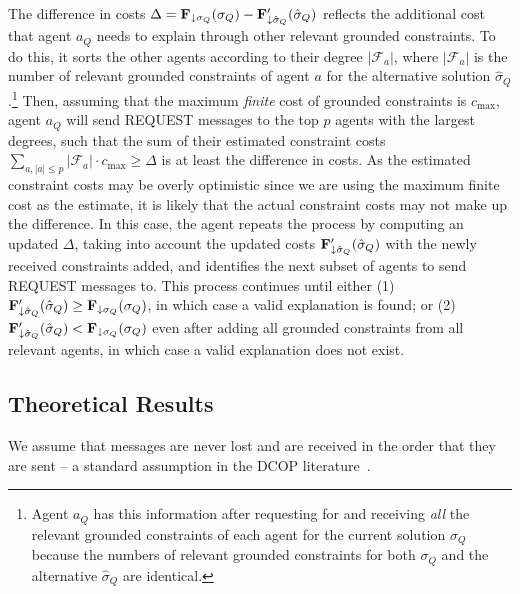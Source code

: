 \documentclass[twoside,11pt]{article}
\begin{document}
The difference in costs $\Delta = {\bf{F}}_{\downarrow \sigma_Q}(\sigma_Q) - {\bf{F}}'_{\downarrow \hat{\sigma}_Q}(\hat{\sigma}_Q)$ reflects the additional cost that agent $a_Q$ needs to explain through other relevant grounded constraints. To do this, it sorts the other agents according to their degree $|\mathcal{F}_a|$, where $|\mathcal{F}_a|$ is the number of relevant grounded constraints of agent $a$ for the alternative solution $\hat{\sigma}_Q$.\footnote{Agent $a_Q$ has this information after requesting for and receiving \emph{all} the relevant grounded constraints of each agent for the current solution $\sigma_Q$ because the numbers of relevant grounded constraints for both $\sigma_Q$ and the alternative $\hat{\sigma}_Q$ are identical.} Then, assuming that the maximum \emph{finite} cost of grounded constraints is $c_{\max}$, agent $a_Q$ will send REQUEST messages to the top $p$ agents with the largest degrees, such that the sum of their estimated constraint costs $\sum_{a, |a| \leq p} |\mathcal{F}_a| \cdot c_{\max} \geq \Delta$ is at least the difference in costs. As the estimated constraint costs may be overly optimistic since we are using the maximum finite cost as the estimate, it is likely that the actual constraint costs may not make up the difference. In this case, the agent repeats the process by computing an updated $\Delta$, taking into account the updated costs ${\bf{F}}'_{\downarrow \hat{\sigma}_Q}(\hat{\sigma}_Q)$ with the newly received constraints added, and identifies the next subset of agents to send REQUEST messages to. This process continues until either (1)~${\bf{F}}'_{\downarrow \hat{\sigma}_Q}(\hat{\sigma}_Q) \geq {\bf{F}}_{\downarrow \sigma_Q}(\sigma_Q)$, in which case a valid explanation is found; or (2)~${\bf{F}}'_{\downarrow \hat{\sigma}_Q}(\hat{\sigma}_Q) < {\bf{F}}_{\downarrow \sigma_Q}(\sigma_Q)$ even after adding all grounded constraints from all relevant agents, in which case a valid explanation does not exist. 


\subsection{Theoretical Results}

We assume that messages are never lost and are received in the order that they are sent -- a standard assumption in the DCOP literature~\cite{fioretto:18}.
\end{document}
